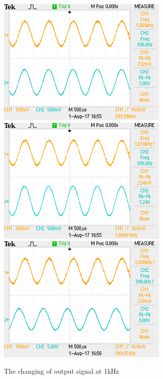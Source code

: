 \begin{figure}[!htbp]
	\centering
	\begin{framed}
		\includegraphics[width=\linewidth]{images/TEK0003.png}
		\includegraphics[width=\linewidth]{images/TEK0004.png}
		\includegraphics[width=\linewidth]{images/TEK0005.png}
		\caption{The changing of output signal at 1kHz}
		\label{fig:wave1k}
	\end{framed}
\end{figure}